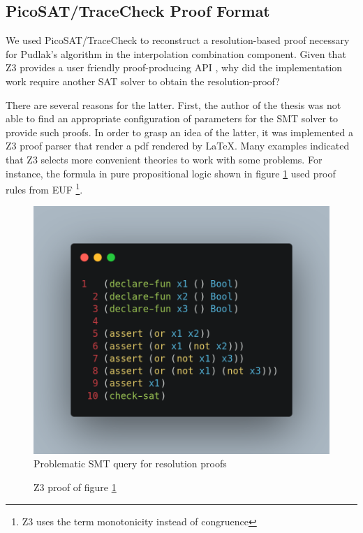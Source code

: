 \subsection{PicoSAT/TraceCheck Proof Format}

We used PicoSAT/TraceCheck to reconstruct a resolution-based proof 
necessary for Pudlak's algorithm in the interpolation combination 
component. Given that Z3 provides a user friendly proof-producing 
API \cite{Moura_proofsand}, why did the implementation
work require another SAT solver to obtain the resolution-proof?

There are several reasons for the latter. First, the author of the
thesis was not able to find an appropriate configuration of parameters
for the SMT solver to provide such proofs. In order to grasp an idea
of the latter, it was implemented a Z3 proof parser that render
a pdf rendered by \LaTeX. Many examples indicated that
Z3 selects more convenient theories to work with some problems. For
instance, the formula in pure propositional logic shown in figure 
\ref{query_proof_problem} used proof rules from EUF \footnote{Z3 uses
the term monotonicity instead of congruence}.

\begin{figure}
  \centering
  \includegraphics[scale=0.2]{query_screenshot}
  \caption{Problematic SMT query for resolution proofs} \label{query_proof_problem}
\end{figure}


%
\begin{figure}
  
  \caption{Z3 proof of figure \ref{query_proof_problem}} \label{smt_proof_problem}
\end{figure}


